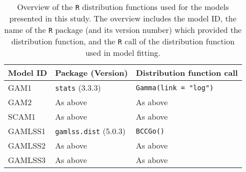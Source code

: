 \begin{table}[H]
  {\tabulinesep=2mm
    \begin{longtabu}{l l L}
      \caption{Overview of the \texttt{R} distribution functions used for the models presented in this study.  The overview includes
        the model ID,
        the name of the \texttt{R} package (and its version number) which provided the distribution function,
        and the \texttt{R} call of the distribution function used in model fitting.
        \label{tab:PresentedModelsOverviewDistributions}} \\
      \toprule
      Model ID & Package (Version) & Distribution function call \\
      \midrule
      \endhead
      \bottomrule
      \endlastfoot
      GAM1 & \texttt{stats} (3.3.3) & \texttt{Gamma(link = "log")} \\
      GAM2 & As above & As above \\
      SCAM1 & As above & As above \\
      GAMLSS1 & \texttt{gamlss.dist} (5.0.3) & \texttt{BCCGo()} \\
      GAMLSS2 & As above & As above \\
      GAMLSS3 & As above & As above \\
      \bottomrule
    \end{longtabu}}
\end{table}

